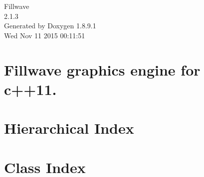 \documentclass[twoside]{book}
\newcommand{\+}{\discretionary{\mbox{\scriptsize$\hookleftarrow$}}{}{}}
\newcommand{\clearemptydoublepage}{%
  \newpage{\pagestyle{empty}\cleardoublepage}%
}
\begin{document}
\hypersetup{pageanchor=false,
             bookmarks=true,
             bookmarksnumbered=true,
             pdfencoding=unicode
            }
\begin{titlepage}
\vspace*{7cm}
\begin{center}%
{\Large Fillwave \\[1ex]\large 2.\+1.\+3 }\\
\vspace*{1cm}
{\large Generated by Doxygen 1.8.9.1}\\
\vspace*{0.5cm}
{\small Wed Nov 11 2015 00:11:51}\\
\end{center}
\end{titlepage}
\clearemptydoublepage
\tableofcontents
\clearemptydoublepage
{}
\hypersetup{pageanchor=true}

\chapter{Fillwave graphics engine for c++11.}
\label{index}\hypertarget{index}{}
\chapter{Hierarchical Index}

\chapter{Class Index}

\end{document}
